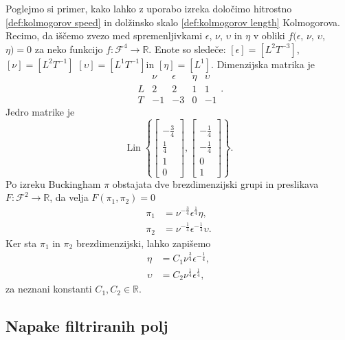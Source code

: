 \documentclass[mat2, tisk]{fmfdelo}
\newcommand{\R}{\mathbb R}
\begin{document}
\begin{primer}
Poglejmo si primer, kako lahko z uporabo izreka določimo hitrostno \eqref{def:kolmogorov speed} in dolžinsko skalo \eqref{def:kolmogorov length} Kolmogorova.
Recimo, da iščemo zvezo med spremenljivkami $\epsilon$, $\nu$, $\upsilon$ in $\eta$ v obliki $f(\epsilon$, $\nu$, $\upsilon$, $\eta) = 0$ za neko funkcijo $f: \mathcal{F}^4 \rightarrow \R$. 
Enote so sledeče: $[\epsilon] = [L^2 T^{-3}]$, $[\nu] = [L^2 T^{-1}]$ $[\upsilon] = [L^1 T^{-1}]$in $[\eta] = [L^1]$. Dimenzijska matrika je
\[
\begin{array}{c|cccc}
 & \nu & \epsilon & \eta & \upsilon \\[-3mm]
\hline
L & 2 & 2 & 1 & 1 \\[-3mm]
T & -1 & -3 & 0 & -1
\end{array}.
\]
Jedro matrike je
$$
\operatorname{Lin} \left\{ 
\begin{bmatrix} 
\\[-17mm]
-\frac{3}{4} \\[-5mm]
\frac{1}{4} \\[-5mm]
1 \\[-5mm]
0 
\end{bmatrix},
\begin{bmatrix} 
\\[-17mm]
-\frac{1}{4} \\[-5mm]
-\frac{1}{4} \\[-5mm]
0 \\[-5mm]
1 
\end{bmatrix}
\right\}.$$
Po izreku Buckingham $\pi$ obstajata dve brezdimenzijski grupi in preslikava $F: \mathcal{F}^2 \rightarrow \R$, da velja $F(\pi_1, \pi_2) = 0$
\begin{align*}
\pi_1 &= \nu^{-\frac{3}{4}} \epsilon^{\frac{1}{4}} \eta, \\
\pi_2 &= \nu^{-\frac{1}{4}} \epsilon^{-\frac{1}{4}} \upsilon.
\end{align*}
Ker sta $\pi_1$ in $\pi_2$ brezdimenzijski, lahko zapišemo
\begin{align*}
\eta &= C_1 \nu^{\frac{3}{4}} \epsilon^{  -\frac{1}{4}}, \\
\upsilon &= C_2 \nu^{\frac{1}{4}} \epsilon^{\frac{1}{4}},
\end{align*}
za neznani konstanti $C_1, C_2 \in \R$. 
\end{primer}

\subsection{Napake filtriranih polj}
\end{document}

